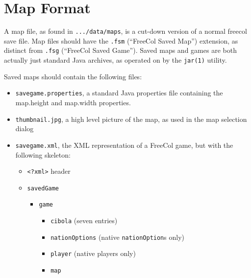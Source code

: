 \documentclass[12pt]{book}
\begin{document}
\hypertarget{Map Format}{\chapter{Map Format}}

A map file, as found in \texttt{.../data/maps}, is a cut-down version
of a normal freecol save file.  Map files should have the
\texttt{.fsm} (``FreeCol Saved Map'') extension, as distinct from
\texttt{.fsg} (``FreeCol Saved Game'').  Saved maps and games are both
actually just standard Java archives, as operated on by the
\texttt{jar(1)} utility.

Saved maps should contain the following files:
\begin{itemize}
  \item \texttt{savegame.properties}, a standard Java properties file
    containing the map.height and map.width properties.
  \item \texttt{thumbnail.jpg}, a high level picture of the map, as
    used in the map selection dialog
  \item \texttt{savegame.xml}, the XML representation of a FreeCol
    game, but with the following skeleton: \begin{itemize}
    \item \texttt{<?xml>} header
    \item \texttt{savedGame} \begin{itemize}
      \item \texttt{game} \begin{itemize}
        \item \texttt{cibola} (seven entries)
        \item \texttt{nationOptions} (native \texttt{nationOption}s only)
        \item \texttt{player} (native players only)
        \item \texttt{map}
      \end{itemize}
    \end{itemize}
  \end{itemize}
\end{itemize}

\printindex
\end{document}
